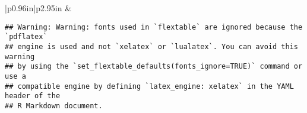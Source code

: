 \documentclass[
]{article}
\begin{document}
\begin{longtable}[c]{|p{0.96in}|p{2.95in}}
 &  \\

\noalign{\global\setlength{\arrayrulewidth}{2pt}}



\end{longtable}

\begin{verbatim}
## Warning: Warning: fonts used in `flextable` are ignored because the `pdflatex`
## engine is used and not `xelatex` or `lualatex`. You can avoid this warning
## by using the `set_flextable_defaults(fonts_ignore=TRUE)` command or use a
## compatible engine by defining `latex_engine: xelatex` in the YAML header of the
## R Markdown document.
\end{verbatim}

\providecommand{\docline}[3]{\noalign{\global\setlength{\arrayrulewidth}{#1}}\arrayrulecolor[HTML]{#2}\cline{#3}}

\setlength{\tabcolsep}{2pt}

\renewcommand*{\arraystretch}{1.5}
\end{document}
